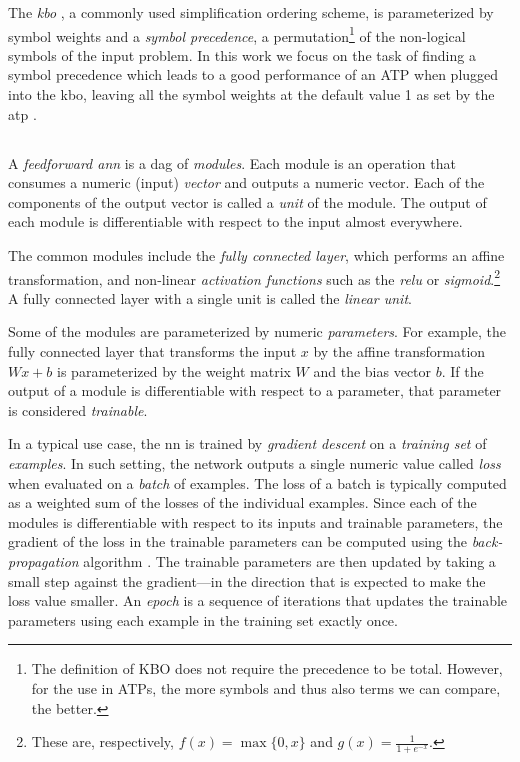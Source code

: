 The \emph{\acrfull{kbo}} \cite{Knuth1983}, a commonly used simplification ordering scheme,
is parameterized by symbol weights and a \emph{symbol precedence},
a permutation\footnote{
The definition of KBO does not require the precedence to be total. 
However, for the use in ATPs, the more symbols and thus also terms 
we can compare, the better. %
} of the non-logical symbols of the input problem.
In this work we focus on the task of finding a symbol precedence which
leads to a good performance of an ATP
when plugged into the \gls{kbo},
leaving all the symbol weights at the default 
value 1 as set by the \gls{atp} \Vampire{}.

\subsection{}

A \emph{feedforward \acrlong{ann}} \cite{DBLP:books/daglib/0040158} is a \acrlong{dag} of \emph{modules}.
Each module is an operation that consumes a numeric (input) \emph{vector} and outputs a numeric vector.
Each of the components of the output vector is called a \emph{unit} of the module.
The output of each module is differentiable with respect to the input almost everywhere.

The common modules include
the \emph{fully connected layer}, which performs an affine transformation,
and non-linear \emph{activation functions} such as the \emph{\gls{relu}} or \emph{sigmoid}.\footnote{
These are, respectively, $f(x) = \max\{0,x\}$ and $g(x) = \frac{1}{1+e^{-x}}$.}
A fully connected layer with a single unit is called the \emph{linear unit}.

Some of the modules are parameterized by numeric \emph{parameters}.
For example, the fully connected layer that transforms the input $x$ by the affine transformation $Wx + b$
is parameterized by the weight matrix $W$ and the bias vector $b$.
If the output of a module is differentiable with respect to a parameter,
that parameter is considered \emph{trainable}.

In a typical use case, the \acrlong{nn} is trained by \emph{gradient descent} on a \emph{training set} of \emph{examples}.
In such setting, the network outputs a single numeric value called \emph{loss} when evaluated on a \emph{batch} of examples.
The loss of a batch is typically computed as a weighted sum of the losses of the individual examples.
Since each of the modules is differentiable with respect to its inputs and trainable parameters,
the gradient of the loss in the trainable parameters
can be computed using the \emph{back-propagation} algorithm \cite{DBLP:books/daglib/0040158}.
The trainable parameters are then updated by taking a small step
against the gradient---in the direction that is expected to make the loss value smaller.
An \emph{epoch} is a sequence of iterations that updates the trainable parameters
using each example in the training set exactly once.


